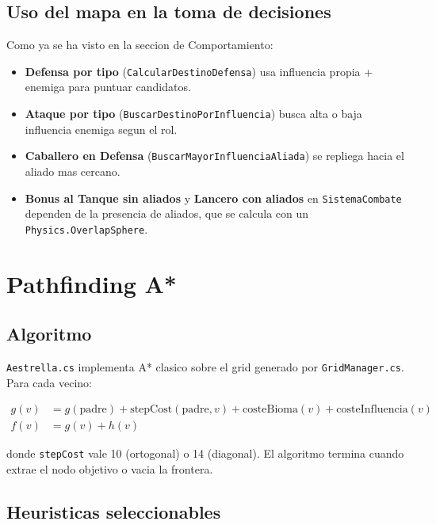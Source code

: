 \documentclass[12pt,a4paper]{article}
\begin{document}
\subsection{Uso del mapa en la toma de decisiones}

Como ya se ha visto en la seccion de Comportamiento:

\begin{itemize}[leftmargin=1.5em]
    \item \textbf{Defensa por tipo} (\texttt{CalcularDestinoDefensa}) usa influencia propia + enemiga para puntuar candidatos.
    \item \textbf{Ataque por tipo} (\texttt{BuscarDestinoPorInfluencia}) busca alta o baja influencia enemiga segun el rol.
    \item \textbf{Caballero en Defensa} (\texttt{BuscarMayorInfluenciaAliada}) se repliega hacia el aliado mas cercano.
    \item \textbf{Bonus al Tanque sin aliados} y \textbf{Lancero con aliados} en \texttt{SistemaCombate} dependen de la presencia de aliados, que se calcula con un \texttt{Physics.OverlapSphere}.
\end{itemize}

\section{Pathfinding A*}

\subsection{Algoritmo}

\texttt{Aestrella.cs} implementa A* clasico sobre el grid generado por
\texttt{GridManager.cs}. Para cada vecino:

\begin{align*}
g(v) &= g(\text{padre}) + \text{stepCost}(\text{padre}, v) + \text{costeBioma}(v) + \text{costeInfluencia}(v) \\
f(v) &= g(v) + h(v)
\end{align*}

donde \texttt{stepCost} vale 10 (ortogonal) o 14 (diagonal). El
algoritmo termina cuando extrae el nodo objetivo o vacia la frontera.

\subsection{Heuristicas seleccionables}
\end{document}
